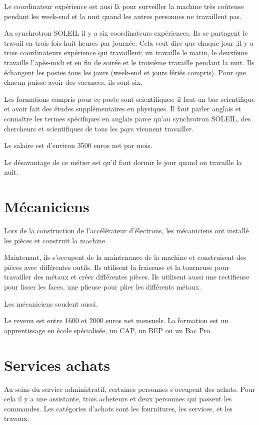 			Le coordinateur expérience est ausi là pour surveiller la machine très coûteuse pendant les week-end et la nuit quand les autres personnes ne travaillent pas.
			
			Au synchrotron SOLEIL il y a six coordinateurs expériences. Ils se partagent le travail en trois fois huit heures par journée. Cela veut dire que chaque jour ,il y a trois coordinateurs expérience qui travaillent; un travaille le matin, le deuxième travaille l'apès-midi et en fin de soirée et le troisième travaille pendant la nuit. Ils échangent les postes tous les jours (week-end et jours fériés compris). Pour que chacun puisse avoir des vacances, ils sont six.
			
			Les formations compris pour ce poste sont scientifiques: il faut un bac scientifique et avoir fait des études supplémentaires en physiques. Il faut parler anglais et connaître les termes spécifiques en anglais parce qu'au synchrotron SOLEIL, des chercheurs et scientifiques de tous les pays viennent travailler.
			
			Le salaire est d'environ 3500 euros net par mois.

			Le désavantage de ce métier est qu'il faut dormir le jour quand on travaille la nuit. 
		
		\section{Mécaniciens}
			Lors de la construction de l'accélérateur d'électrons, les mécaniciens ont installé les pièces et construit la machine. 
			
			Maintenant, ils s'occupent de la maintenance de la machine et construisent des pièces avec différentes outils. Ils utilisent la fraiseuse et la tourneuse pour travailler des métaux et créer différentes pièces. Ils utilisent aussi une rectifieuse pour lisser les faces, une plieuse pour plier les différents métaux. 

			Les mécaniciens soudent aussi.
			
			Le revenu est entre 1600 et 2000 euros net mensuels. La formation est un apprentissage en école spécialisée, un CAP, un BEP ou un Bac Pro.
		
		\section{Services achats}
			Au seins du service administratif, certaines personnes s'occupent des achats. Pour cela il y a une assistante, trois acheteurs et deux personnes qui passent les commandes. Les catégories d'achats sont les fournitures, les services, et les travaux.
		
